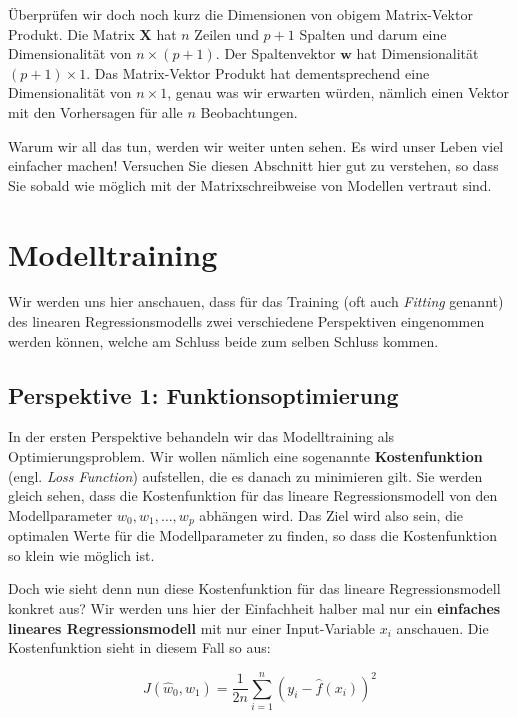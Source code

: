 \documentclass[
]{book}
\begin{document}
Überprüfen wir doch noch kurz die Dimensionen von obigem Matrix-Vektor Produkt. Die Matrix \(\mathbf{X}\) hat \(n\) Zeilen und \(p+1\) Spalten und darum eine Dimensionalität von \(n \times (p+1)\). Der Spaltenvektor \(\mathbf{w}\) hat Dimensionalität \((p+1) \times 1\). Das Matrix-Vektor Produkt hat dementsprechend eine Dimensionalität von \(n \times 1\), genau was wir erwarten würden, nämlich einen Vektor mit den Vorhersagen für alle \(n\) Beobachtungen.

Warum wir all das tun, werden wir weiter unten sehen. Es wird unser Leben viel einfacher machen! Versuchen Sie diesen Abschnitt hier gut zu verstehen, so dass Sie sobald wie möglich mit der Matrixschreibweise von Modellen vertraut sind.

\hypertarget{modelltraining}{%
\section{Modelltraining}\label{modelltraining}}

Wir werden uns hier anschauen, dass für das Training (oft auch \emph{Fitting} genannt) des linearen Regressionsmodells zwei verschiedene Perspektiven eingenommen werden können, welche am Schluss beide zum selben Schluss kommen.

\hypertarget{perspektive-1-funktionsoptimierung}{%
\subsection{Perspektive 1: Funktionsoptimierung}\label{perspektive-1-funktionsoptimierung}}

In der ersten Perspektive behandeln wir das Modelltraining als Optimierungsproblem. Wir wollen nämlich eine sogenannte \textbf{Kostenfunktion} (engl. \emph{Loss Function}) aufstellen, die es danach zu minimieren gilt. Sie werden gleich sehen, dass die Kostenfunktion für das lineare Regressionsmodell von den Modellparameter \(w_0,w_1,\dots,w_p\) abhängen wird. Das Ziel wird also sein, die optimalen Werte für die Modellparameter zu finden, so dass die Kostenfunktion so klein wie möglich ist.

Doch wie sieht denn nun diese Kostenfunktion für das lineare Regressionsmodell konkret aus? Wir werden uns hier der Einfachheit halber mal nur ein \textbf{einfaches lineares Regressionsmodell} mit nur einer Input-Variable \(x_i\) anschauen. Die Kostenfunktion sieht in diesem Fall so aus:

\[
J(\hat{w}_0,\hat{w}_1) = \frac{1}{2n} \sum_{i=1}^{n} \left(y_i - \hat{f}(x_i) \right)^2
\]
\end{document}
